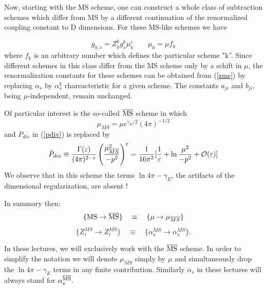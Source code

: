\documentclass[12pt]{article}
\newcommand{\ord}{{\cal O}}
\begin{document}
\begin{itemize}
Now, starting with the MS scheme, one can construct a whole class
of subtraction schemes which differ from MS by a different continuation
of the renormalized coupling constant to D dimensions. For these
MS-like schemes we have

\begin{equation}
g_{0,s}=Z^k_g g^k_s \mu^\varepsilon_k
\qquad
\mu_k=\mu f_k
\end{equation}
where $f_k$ is an arbitrary number which defines the particular
scheme "k''. Since different schemes in this class differ from the
MS scheme only by a schift in $\mu$, the renormalization constants
for these schemes can be obtained from (\ref{zms}) by replacing
$\alpha_s$ by $\alpha^k_s$ chareacteristic for a given scheme.
The constants $a_{ji}$ and $b_{ji}$, being $\mu$-independent,
remain unchanged.

Of particular interest is the so-called  $\overline{\rm MS}$ scheme
\cite{BBDM} in which
\begin{equation}\label{msms}
\mu_{\overline{MS}}=\mu e^{\gamma_E/2}(4\pi)^{-1/2}
\end{equation}
and $P_{div}$ in (\ref{pdiv}) is replaced by
\begin{equation}\label{pdivb}
\bar P_{div}\equiv \frac{\Gamma(\varepsilon)}{(4\pi)^{2-\varepsilon}}
\left(\frac{\mu^2_{\overline{MS}}}{-p^2}\right)^\varepsilon
=\frac{1}{16\pi^2}
\lbrack \frac{1}{\varepsilon}+\ln\frac{\mu^2}{-p^2}
+\ord(\varepsilon)
\rbrack
\end{equation}
We observe that in this scheme the terms $\ln 4\pi-\gamma_E$,
the artifacts of the dimensional regularization, are absent !

In summary then:
\begin{equation}
\lbrace{\rm MS \to \overline{MS} }\rbrace\quad 
\equiv\quad \lbrace{\mu\to\mu_{\overline{MS}}}\rbrace
\end{equation}
\begin{equation}
\lbrace Z_i^{{MS}} \to Z_i^{\overline{MS}}\rbrace\quad \equiv\quad
\lbrace\alpha_s^{MS} \to \alpha_s^{\overline{MS}}\rbrace.
\end{equation}

In these lectures, we will exclusively work with the $\overline{\rm MS}$
scheme. In order to simplify the notation we will denote
$\mu_{\overline{MS}}$ simply by $\mu$ and simultaneously drop
the $\ln 4 \pi-\gamma_E$ terms in any finite contribution. Similarly
$\alpha_s$ in these lectures will always stand for 
$ \alpha_s^{\overline{\rm MS}}$.


\end{itemize}
\end{document}
